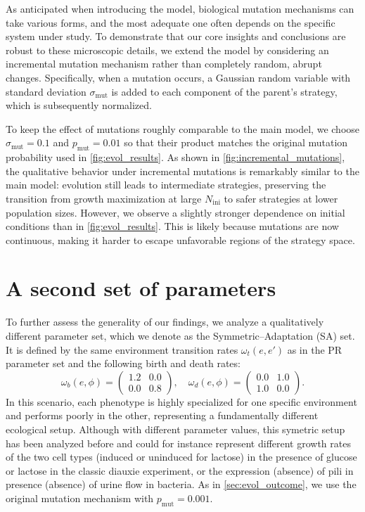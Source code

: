 \documentclass[aps,pre,reprint,10pt,superscriptaddress]{revtex4-2}
\begin{document}
As anticipated when introducing the model, biological mutation mechanisms can take various forms, and the most adequate one often depends on the specific system under study. To demonstrate that our core insights and conclusions are robust to these microscopic details, we extend the model by considering an incremental mutation mechanism rather than completely random, abrupt changes. Specifically, when a mutation occurs, a Gaussian random variable with standard deviation $\sigma_\text{mut}$ is added to each component of the parent's strategy, which is subsequently normalized.

To keep the effect of mutations roughly comparable to the main model, we choose $\sigma_\text{mut}=0.1$ and $p_\text{mut}=0.01$ so that their product matches the original mutation probability used in \cref{fig:evol_results}. As shown in \cref{fig:incremental_mutations}, the qualitative behavior under incremental mutations is remarkably similar to the main model: evolution still leads to intermediate strategies, preserving the transition from growth maximization at large $N_\text{ini}$ to safer strategies at lower population sizes. However, we observe a slightly stronger dependence on initial conditions than in \cref{fig:evol_results}. This is likely because mutations are now continuous, making it harder to escape unfavorable regions of the strategy space.

\section{A second set of parameters} \label{sec:symmetric_parameters}

To further assess the generality of our findings, we analyze a qualitatively different parameter set, which we denote as the Symmetric--Adaptation (SA) set. It is defined by the same environment transition rates $\omega_t(e,e')$ as in the PR parameter set and the following birth and death rates:
\begin{equation}
    \omega_b(e,\phi)=\begin{pmatrix}1.2&0.0\\0.0&0.8\end{pmatrix}, \quad \omega_d(e,\phi)=\begin{pmatrix}0.0&1.0\\1.0&0.0\end{pmatrix}.
\end{equation}
In this scenario, each phenotype is highly specialized for one specific environment and performs poorly in the other, representing a fundamentally different ecological setup. Although with different parameter values, this symetric setup has been analyzed before \cite{beleteOptimalityAdaptationPhenotypically2015,kussellPhenotypicDiversityPopulation2005} and could for instance represent different growth rates of the two cell types (induced or uninduced for lactose) in the presence of glucose or lactose in the classic diauxie experiment, or the expression (absence) of pili in presence (absence) of urine flow in bacteria\cite{thattaiStochasticGeneExpression2004}. As in \cref{sec:evol_outcome}, we use the original mutation mechanism with $p_\text{mut}=0.001$.
\end{document}
